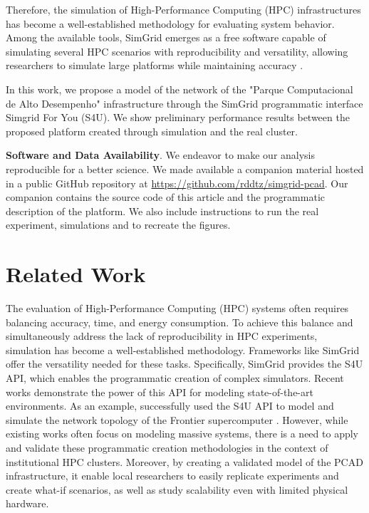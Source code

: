 \documentclass[12pt]{article}
\begin{document}
Therefore, the simulation of High-Performance Computing (HPC)
infrastructures has become a well-established methodology for
evaluating system behavior. Among the available tools, SimGrid emerges
as a free software capable of simulating several HPC scenarios with
reproducibility and versatility, allowing researchers to simulate
large platforms while maintaining accuracy \cite{simgrid2025}.

In this work, we propose a model of the network of the "Parque
Computacional de Alto Desempenho" infrastructure \cite{LPPD} through the
SimGrid programmatic interface Simgrid For You (S4U). We show
preliminary performance results between the proposed platform created
through simulation and the real cluster.


\noindent
\textbf{Software and Data Availability}. We endeavor to make our analysis
reproducible for a better science. We made available a companion
material hosted in a public GitHub repository at
{\scriptsize\url{https://github.com/rddtz/simgrid-pcad}}.
Our companion contains the source code of this article and the
programmatic description of the platform. We also include instructions
to run the real experiment, simulations and  to recreate the figures.


\section{Related Work}
\label{sec:orgd0a12c5}
\label{org66bbb24}

The evaluation of High-Performance Computing (HPC) systems often
requires balancing accuracy, time, and energy consumption. To achieve
this balance and simultaneously address the lack of reproducibility in
HPC experiments, simulation has become a well-established
methodology. Frameworks like SimGrid offer the versatility needed for
these tasks. Specifically, SimGrid provides the S4U API, which enables
the programmatic creation of complex simulators. Recent works
demonstrate the power of this API for modeling state-of-the-art
environments. As an example, \cite{arthur2025} successfully used the S4U
API to model and simulate the network topology of the Frontier
supercomputer \cite{frontier}. However, while existing works often focus
on modeling massive systems, there is a need to apply and validate
these programmatic creation methodologies in the context of
institutional HPC clusters. Moreover, by creating a validated model of
the PCAD infrastructure, it enable local researchers to easily
replicate experiments and create what-if scenarios, as well as study
scalability even with limited physical hardware.
\end{document}

